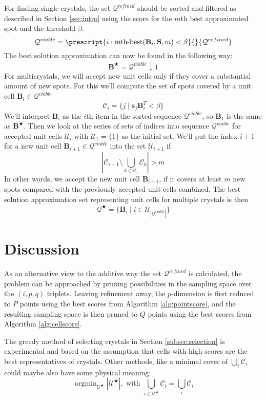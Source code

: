 \documentclass[a4paper,10pt]{article}
\DeclareMathOperator*{\argmin}{argmin}
\newcommand{\vect}[1]{\mathbf{#1}}
\newcommand{\mat}[1]{\mathbf{#1}}
\begin{document}
For finding single crystals, the set $\mathcal{Q}^{refined}$ should be sorted and filtered as described in Section \ref{sec:intro} using the score for the $m$th best approximated spot and the threshold $\beta$:
%
\[
\mathcal{Q}^{viable} = \prescript{i:\text{mth-best}(\mat{B}_i,\mat{S},m)<\beta}{}{\mathcal{Q}^{refined}}
\]
%
The best solution approximation can now be found in the following way:
%
\[
 \mat{B}^\bigstar = \mathcal{Q}^{viable}\downarrow 1
\]
%
For multicrystals, we will accept new unit cells only if they cover a substantial amount of new spots. For this we'll compute the set of spots covered by a unit cell $\mat{B}_i\in\mathcal{Q}^{viable}$
%
\[
 \mathcal{C}_i = \{ j \mid \vect{s}_j\mat{B}_i^T < \beta \}
\]
%
We'll interpret $\mat{B}_i$ as the $i$th item in the sorted sequence $\mathcal{Q}^{viable}$, so $\mat{B}_1$ is the same as $\mat{B}^\bigstar$. Then we look at the series of sets of indices into sequence $\mathcal{Q}^{viable}$ for accepted unit cells $\mathcal{U}_i$ with $\mathcal{U}_1 = \{ 1 \}$ as the initial set. We'll put the index $i+1$ for a new unit cell $\mat{B}_{i+1} \in \mathcal{Q}^{viable}$ into the set $\mathcal{U}_{i+1}$ if
%
\[
 \left| \mathcal{C}_{i+1} \setminus \bigcup_{k \in \mathcal{U}_i} \mathcal{C}_k \right| > m
\]
%
In other words, we accept the new unit cell $\mat{B}_{i+1}$, if it covers at least $m$ new spots compared with the previously accepted unit cells combined. The best solution approximation set representing unit cells for multiple crystals is then
%
\[
\mathcal{Q}^\bigstar = \{ \mat{B}_i \mid  i \in \mathcal{U}_{|\mathcal{Q}^{viable}|} \}
\]

\section{Discussion}

As an alternative view to the additive way the set $\mathcal{Q}^{refined}$ is calculated, the problem can be approached by pruning possibilities in the sampling space over the $(i,p,q)$ triplets. Leaving refinement away, the $p$-dimension is first reduced to $P$ points using the best scores from Algorithm \ref{alg:pointscore}, and the resulting sampling space is then pruned to $Q$ points using the best scores from Algorithm \ref{alg:cellscore}.

The greedy method of selecting crystals in Section \ref{subsec:selection} is experimental and based on the assumption that cells with high scores are the best representatives of crystals. Other methods, like a minimal cover of $\bigcup_i \mathcal{C}_i$ could maybe also have some physical meaning:
%
\[
 \argmin_{\mathcal{U}^\bigstar} |\mathcal{U}^\bigstar|, \text{ with }\bigcup_{i\in \mathcal{U}^\bigstar} \mathcal{C}_i = \bigcup_i \mathcal{C}_i
\]
\end{document}
